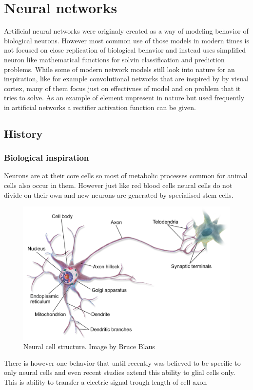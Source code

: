 \chapter{Neural networks}
Artificial neural networks were originaly created as a way of modeling behavior of biological
neurons. However most common use of those models in modern times is not focused on close
replication of biological behavior and instead uses simplified neuron like mathematical 
functions for solvin classification and prediction problems.
While some of modern network models still look into nature for an inspiration, like for example
convolutional networks that are inspired by by visual cortex, many of them focus just on 
effectivnes of model and on problem that it tries to solve.
As an example of element unpresent in nature but used frequently in artificial networks a 
rectifier activation function can be given.

\section{History}

\subsection{Biological inspiration}
Neurons are at their core cells so most of metabolic processes common for animal cells also
occur in them. However just like red blood cells neural cells do not divide on their own and new
neurons are generated by specialised stem cells.
\begin{figure}[hb]
	\includegraphics[width=\textwidth]{res/Blausen_MultipolarNeuron}
	\caption{Neural cell structure. Image by Bruce Blaus}
	\label{fig:Blausen-Neuron}
\end{figure}
There is however one behavior that until recently was believed to be specific to only neural cells
and even recent studies extend this ability to glial cells only.
This is ability to transfer a electric signal trough length of cell axon 

